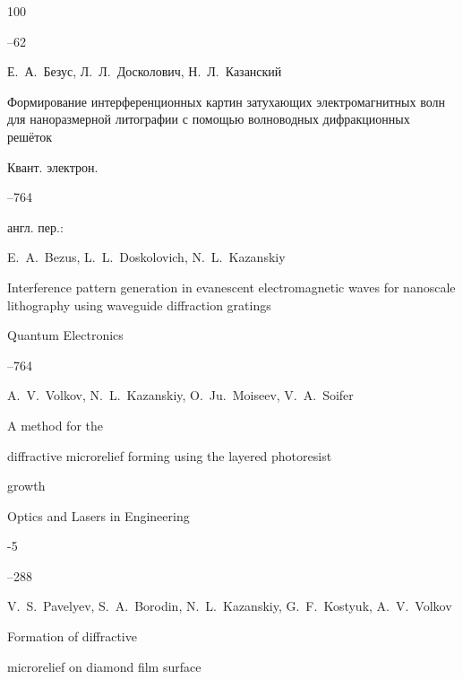 \begin{thebibliography}{100}



--62




\by  Е.~А.~Безус, Л.~Л.~Досколович, Н.~Л.~Казанский

\paper Формирование интерференционных картин затухающих электромагнитных волн для наноразмерной литографии с помощью волноводных дифракционных решёток

\jour Квант. электрон.




--764

\transl англ. пер.:~

\by E.~A.~Bezus, L.~L.~Doskolovich, N.~L.~Kazanskiy

\paper Interference pattern generation in evanescent electromagnetic waves for nanoscale lithography using waveguide diffraction gratings

\jour Quantum Electronics




–764





\by  A.~V.~Volkov, N.~L.~Kazanskiy, O.~Ju.~Moiseev, V.~A.~Soifer

\paper A method for the

diffractive microrelief forming using the layered photoresist

growth

\jour Optics and Lasers in Engineering



-5

--288




\by  V.~S.~Pavelyev, S.~A.~Borodin, N.~L.~Kazanskiy, G.~F.~Kostyuk, A.~V.~Volkov

\paper Formation of diffractive

microrelief on diamond film surface


\end{thebibliography}

